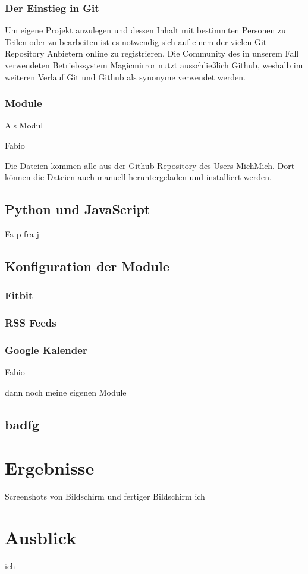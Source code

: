 \documentclass[12pt,a4paper]{report}
\begin{document}
\subsection*{Der Einstieg in Git}
Um eigene Projekt anzulegen und dessen Inhalt mit bestimmten Personen zu Teilen oder zu bearbeiten ist es notwendig sich auf einem der vielen Git-Repository Anbietern online zu registrieren. Die Community des in unserem Fall verwendeten Betriebssystem Magicmirror nutzt ausschließlich Github, weshalb im weiteren Verlauf Git und Github als synonyme verwendet werden. 
\subsection{Module}
Als Modul

Fabio


Die Dateien kommen alle aus der Github-Repository des Users MichMich. Dort können die Dateien auch manuell heruntergeladen und installiert werden. 
\section{Python und JavaScript}
Fa p fra j
\section{Konfiguration der Module}
\subsection{Fitbit}
\subsection{RSS Feeds}
\subsection{Google Kalender}
Fabio

dann noch meine eigenen Module
\section{badfg}






\chapter{Ergebnisse}
Screenshots von Bildschirm und fertiger Bildschirm
ich
\chapter{Ausblick}
ich
\end{document}
